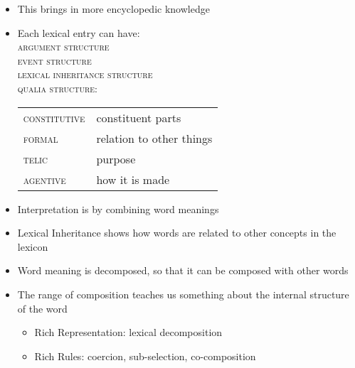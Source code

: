 \documentclass[headrule,footrule]{foils}
\begin{document}
\begin{itemize}
\item This brings in more encyclopedic knowledge
\item Each lexical entry can have:\\
  \textsc{argument structure} \\
  \textsc{event structure}\\
  \textsc{lexical inheritance structure} \\
  \textsc{qualia structure}:\\[1ex]
  \begin{tabular}{ll}
    \textsc{constitutive} & constituent parts \\
    \textsc{formal} & relation to other things \\
    \textsc{telic} & purpose \\
    \textsc{agentive}  & how it is made
  \end{tabular}
\item Interpretation is  by combining word meanings
\item Lexical Inheritance shows how words are related to other concepts in the lexicon
\end{itemize}





\begin{itemize}
\item Word meaning is decomposed, so that it can be composed with other words
\item The range of composition teaches us something about the internal
  structure of the word
  \begin{itemize}
  \item Rich Representation: lexical decomposition
  \item Rich Rules: coercion, sub-selection, co-composition
  \end{itemize}

\end{itemize}

\end{document}
